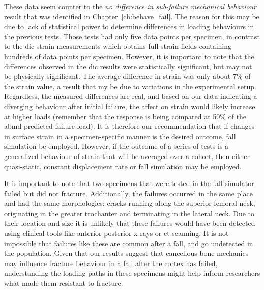 These data seem counter to the \textit{no difference in sub-failure mechanical behaviour} result that was identified in Chapter~\ref{ch:behave_fail}.
The reason for this may be due to lack of statistical power to determine differences in loading behaviours in the previous tests.
Those tests had only five data points per specimen, in contrast to the \ac{dic} strain measurements which obtains full strain fields containing hundreds of data points per specimen.
However, it is important to note that the differences observed in the \ac{dic} results were statistically significant, but may not be physically significant.
The average difference in strain was only about 7\% of the strain value, a result that my be due to variations in the experimental setup.
Regardless, the measured differences are real, and based on our data indicating a diverging behaviour after initial failure, the affect on strain would likely increase at higher loads (remember that the response is being compared at 50\% of the \ac{abmd} predicted failure load).
It is therefore our recommendation that if changes in surface strain in a specimen-specific manner is the desired outcome, fall simulation be employed.
However, if the outcome of a series of tests is a generalized behaviour of strain that will be averaged over a cohort, then either quasi-static, constant displacement rate or fall simulation may be employed.

It is important to note that two specimens that were tested in the fall simulator failed but did not fracture.
Additionally, the failures occurred in the same place and had the same morphologies: cracks running along the superior femoral neck, originating in the greater trochanter and terminating in the lateral neck.
Due to their location and size it is unlikely that these failures would have been detected using clinical tools like anterior-posterior x-rays or \ac{ct} scanning.
It is not impossible that failures like these are common after a fall, and go undetected in the population.
Given that our results suggest that cancellous bone mechanics may influence fracture behaviour in a fall after the cortex has failed, understanding the loading paths in these specimens might help inform researchers what made them resistant to fracture.

